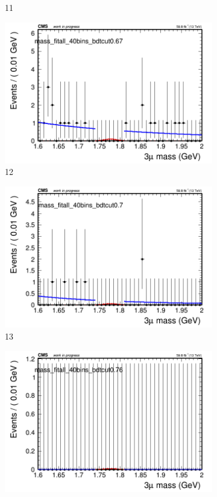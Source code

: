 \begin{figure}[h!]
\begin{subfigure}{0.2\textwidth}
        \caption{11}
    \end{subfigure}
    \begin{subfigure}{0.2\textwidth}
        \includegraphics[width=\textwidth]{power_law/plots/all/massfit_all_40bins_bdtcut0.67.png}
        \caption{12}
    \end{subfigure}
    \begin{subfigure}{0.2\textwidth}
        \includegraphics[width=\textwidth]{power_law/plots/all/massfit_all_40bins_bdtcut0.7.png}
        \caption{13}
    \end{subfigure}
    \begin{subfigure}{0.2\textwidth}
        \includegraphics[width=\textwidth]{power_law/plots/all/massfit_all_40bins_bdtcut0.76.png}

\end{subfigure}
\end{figure}
